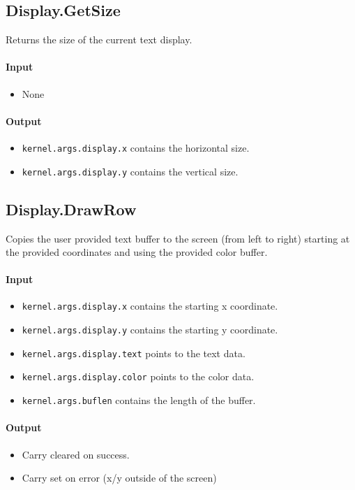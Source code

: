 \subsection*{Display.GetSize}
Returns the size of the current text display.

\paragraph{Input}
\begin{itemize}
\item None
\end{itemize}

\paragraph{Output}
\begin{itemize}
\item \verb+kernel.args.display.x+ contains the horizontal size.
\item \verb+kernel.args.display.y+ contains the vertical size.
\end{itemize}

\subsection*{Display.DrawRow}
Copies the user provided text buffer to the screen (from left to right) starting at the provided coordinates and using the provided color buffer.

\paragraph{Input}
\begin{itemize}
\item \verb+kernel.args.display.x+ contains the starting x coordinate.
\item \verb+kernel.args.display.y+ contains the starting y coordinate.
\item \verb+kernel.args.display.text+ points to the text data.
\item \verb+kernel.args.display.color+ points to the color data.
\item \verb+kernel.args.buflen+ contains the length of the buffer.
\end{itemize}

\paragraph{Output}
\begin{itemize}
\item Carry cleared on success.
\item Carry set on error (x/y outside of the screen)
\end{itemize}

